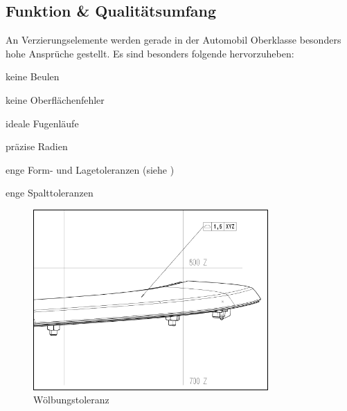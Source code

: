 \documentclass[12pt,a4paper,parskip]{scrartcl}
\begin{document}
\subsection{Funktion \& Qualitätsumfang}
An Verzierungselemente werden gerade in der Automobil Oberklasse besonders hohe Ansprüche gestellt. Es sind besonders folgende hervorzuheben:
\begin{itemize*}
\item keine Beulen
\item keine Oberflächenfehler
\item ideale Fugenläufe
\item präzise Radien
\item enge Form- und Lagetoleranzen (siehe )
\item enge Spalttoleranzen
\end{itemize*}
\begin{figure}[hbtp]
  \centering
  \includegraphics[width=0.8\textwidth]{vdkdtol}
  \caption{Wölbungstoleranz}
  \label{fig:vdkdtol}
  \end{figure}
  
\end{document}
